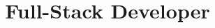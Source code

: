 \documentclass[11pt,a4paper,sans]{moderncv}
\title{Full-Stack Developer}
\begin{document}
\makecvtitle
\end{document}
